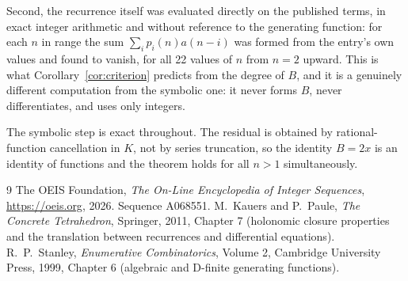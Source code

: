 \documentclass[11pt,a4paper]{article}
\theoremstyle{plain}
\theoremstyle{definition}
\begin{document}
Second, the recurrence itself was evaluated directly on the published terms, in exact
integer arithmetic and without reference to the generating function: for each $n$ in range
the sum $\sum_{i}p_{i}(n)a(n-i)$ was formed from the entry's own values and found to
vanish, for all 22 values of $n$ from $n=2$ upward. This is what
Corollary~\ref{cor:criterion} predicts from the degree of $B$, and it is a genuinely
different computation from the symbolic one: it never forms $B$, never differentiates, and
uses only integers.

The symbolic step is exact throughout. The residual is obtained by rational-function
cancellation in $K$, not by series truncation, so the identity $B=2 x$ is an
identity of functions and the theorem holds for all $n>1$ simultaneously.

\begin{thebibliography}{9}
 The OEIS Foundation, \emph{The On-Line Encyclopedia of Integer Sequences},
\url{https://oeis.org}, 2026. Sequence A068551.
 M.~Kauers and P.~Paule, \emph{The Concrete Tetrahedron}, Springer, 2011,
Chapter 7 (holonomic closure properties and the translation between recurrences and
differential equations).
 R.~P.~Stanley, \emph{Enumerative Combinatorics}, Volume 2, Cambridge
University Press, 1999, Chapter 6 (algebraic and D-finite generating functions).
\end{thebibliography}
\end{document}
